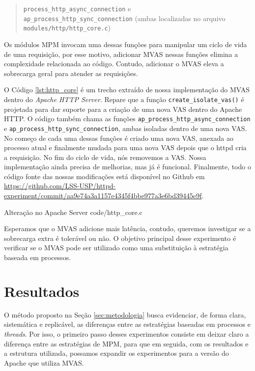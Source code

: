 \begin{quote}
  \texttt{process\_http\_async\_connection} e\\
  \texttt{ap\_process\_http\_sync\_connection} (ambas localizadas no arquivo
  \texttt{modules/http/http\_core.c})
\end{quote}

Os módulos MPM invocam uma dessas funções para manipular um ciclo de vida de
uma requisição, por esse motivo, adicionar MVAS nessas funções elimina a
complexidade relacionada ao código. Contudo, adicionar o MVAS eleva a
sobrecarga geral para atender as requisições.

O Código \ref{lst:http_core} é um trecho extraído de nossa implementação do MVAS
dentro do \emph{Apache HTTP Server}. Repare que a função \texttt{create\_isolate\_vas()} é
projetada para dar suporte para a criação de uma nova VAS dentro do Apache
HTTP. O código também chama as funções
\texttt{ap\_process\_http\_async\_connection} e
\texttt{ap\_process\_http\_sync\_connection}, ambas isoladas dentro de uma nova
VAS. No começo de cada uma dessas funções é criado uma nova VAS, anexada ao
processo atual e finalmente mudada para uma nova VAS depois que o httpd cria a
requisição. No fim do ciclo de vida, nós removemos a VAS. Nossa implementação
ainda precisa de melhorias, mas já é funcional. Finalmente, todo o código fonte
das nossas modificações está disponível no Github em
\url{https://github.com/LSS-USP/httpd-experiment/commit/aa9e74a3a1157e4345f4bbe977a3e6bd39445e9f}.

\begin{ruledcaption}{Alteração no Apache Server\label{lst:http_core}}
 {code/http_core.c}
\end{ruledcaption}

Esperamos que o MVAS adicione mais latência, contudo, queremos
investigar se a sobrecarga extra é tolerável ou não. O objetivo principal desse
experimento é verificar se o MVAS pode ser utilizado como uma substituição à
estratégia baseada em processos.

\section{Resultados}
\label{sec:preliminary}

O método proposto na Seção \ref{sec:metodologia} busca evidenciar, de forma
clara, sistemática e replicável, as diferenças entre as estratégias baseadas em
processos e \emph{threads}. Por isso, o primeiro passo desses experimentos consiste em
deixar claro a diferença entre as estratégias de MPM, para que em seguida, com
os resultados e a estrutura utilizada, possamos expandir os experimentos para a
versão do Apache que utiliza MVAS.

